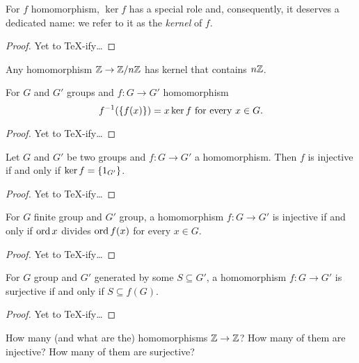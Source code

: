 For \(f\) homomorphism, \(\ker f\) has a special role and, consequently, it deserves a dedicated name: we refer to it as the {\em kernel} of \(f\).

\begin{proof}
Yet to \TeX{}-ify\dots{}
\end{proof}

\begin{exercise}
Any homomorphism \(\mathbb Z \to \mathbb Z/n\mathbb Z\) has kernel that contains \(n\mathbb Z\).
\end{exercise}

\begin{proposition}
For \(G\) and \(G'\) groups and \(f : G \to G'\) homomorphism
\[f^{-1} (\left\{f(x)\right\}) = x \ker f \text{ for every } x \in G .\]
\end{proposition}

\begin{proof}
Yet to \TeX{}-ify\dots{}
\end{proof}

\begin{proposition}
Let \(G\) and \(G'\) be two groups and \(f : G \to G'\) a homomorphism. Then \(f\) is injective if and only if \(\ker f = \left\{1_{G'}\right\}\).
\end{proposition}

\begin{proof}
Yet to \TeX{}-ify\dots{}
\end{proof}

\begin{proposition}
For \(G\) finite group and \(G'\) group, a homomorphism \(f : G \to G'\) is injective if and only if \(\operatorname{ord} x\) divides \(\operatorname{ord} f(x)\) for every \(x \in G\).
\end{proposition}

\begin{proof}
Yet to \TeX{}-ify\dots{}
\end{proof}

\begin{proposition}
For \(G\) group and \(G'\) generated by some \(S \subseteq G'\), a homomorphism \(f : G \to G'\) is surjective if and only if \(S \subseteq f(G)\).
\end{proposition}

\begin{proof}
Yet to \TeX{}-ify\dots{}
\end{proof}

\begin{exercise}
How many (and what are the) homomorphisms \(\mathbb Z \to \mathbb Z\)? How many of them are injective? How many of them are surjective?
\end{exercise}

